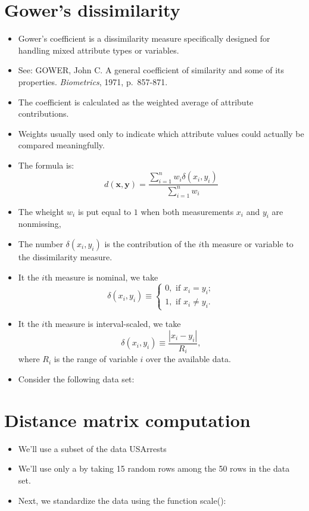 \documentclass[
]{article}
\providecommand{\tightlist}{%
  \setlength{\itemsep}{0pt}\setlength{\parskip}{0pt}}
\begin{document}
\hypertarget{gowers-dissimilarity}{%
\section{Gower's dissimilarity}\label{gowers-dissimilarity}}

\begin{itemize}
\tightlist
\item
  Gower's coefficient is a dissimilarity measure specifically designed
  for handling mixed attribute types or variables.
\item
  See: GOWER, John C. A general coefficient of similarity and some of
  its properties. \emph{Biometrics}, 1971, p.~857-871.
\item
  The coefficient is calculated as the weighted average of attribute
  contributions.
\item
  Weights usually used only to indicate which attribute values could
  actually be compared meaningfully.
\item
  The formula is: \[
  d(\mathbf{x},\mathbf{y})=\frac{\sum_{i=1}^n w_i \delta(x_i,y_i)}{\sum_{i=1}^n w_i}
  \]
\item
  The wheight \(w_i\) is put equal to \(1\) when both measurements
  \(x_i\) and \(y_i\) are nonmissing,
\item
  The number \(\delta(x_i,y_i)\) is the contribution of the \(i\)th
  measure or variable to the dissimilarity measure.
\item
  It the \(i\)th measure is nominal, we take\\
  \[
  \delta(x_i,y_i)\equiv \begin{cases}0,
  \text{ if } x_i=y_i;\\1,\text{ if } x_i \neq y_i.\end{cases}
  \]
\item
  It the \(i\)th measure is interval-scaled, we take\\
  \[
  \delta(x_i,y_i)\equiv \frac{|x_i-y_i|}{R_i},
  \] where \(R_i\) is the range of variable \(i\) over the available
  data.
\item
  Consider the following data set:
\end{itemize}

\hypertarget{distance-matrix-computation}{%
\section{Distance matrix
computation}\label{distance-matrix-computation}}

\begin{itemize}
\tightlist
\item
  We'll use a subset of the data USArrests
\item
  We'll use only a by taking 15 random rows among the 50 rows in the
  data set.
\item
  Next, we standardize the data using the function scale():
\end{itemize}
\end{document}
